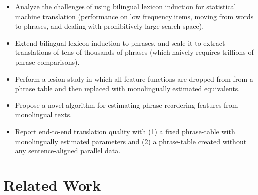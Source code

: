 \documentclass[11pt]{article}
\newcommand{\mnote}[1]{\marginpar{%
  \vskip-\baselineskip
  \raggedright\footnotesize
  \itshape\hrule\smallskip\tiny{#1}\par\smallskip\hrule}}
\newcommand{\mtodo}[1]{\mnote{\textcolor{red}{#1}}}
\newcommand{\secref}[1]{Section~\ref{#1}}
\begin{document}


\begin{itemize}
  \item Analyze the challenges of using bilingual lexicon induction for statistical machine translation (performance on low frequency items, moving from words to phrases, and dealing with prohibitively large search space).
  \item Extend bilingual lexicon induction to phrases, and scale it to extract translations of tens of thousands of  phrases (which naively requires trillions of phrase comparisons). 
  \item Perform a lesion study in which all feature functions are dropped from from a phrase table and then replaced with monolingually estimated equivalents.
  \item Propose a novel algorithm for estimating phrase reordering features from monolingual texts.
  \item Report end-to-end translation quality with (1) a fixed phrase-table with monolingually estimated parameters and (2) a phrase-table created without any sentence-aligned parallel data.
\end{itemize}

\section{Related Work} \label{sect:related-work}
\end{document}
